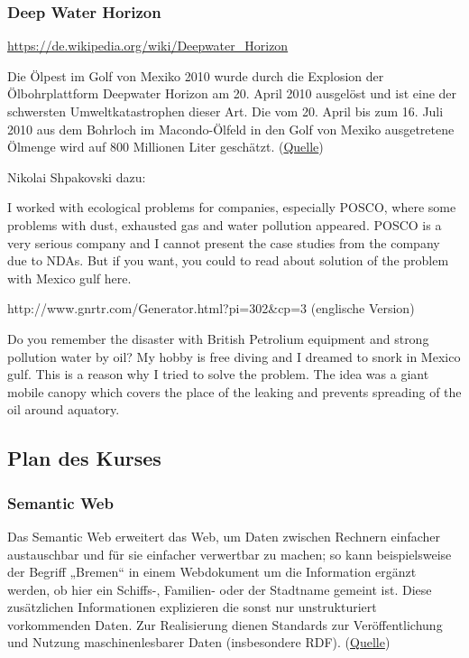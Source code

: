 \documentclass[11pt,a4paper]{article}
\begin{document}
\hypertarget{deep-water-horizon}{%
\subsubsection{Deep Water Horizon}\label{deep-water-horizon}}

\url{https://de.wikipedia.org/wiki/Deepwater_Horizon}

Die Ölpest im Golf von Mexiko 2010 wurde durch die Explosion der
Ölbohrplattform Deepwater Horizon am 20. April 2010 ausgelöst und ist
eine der schwersten Umweltkatastrophen dieser Art. Die vom 20. April bis
zum 16. Juli 2010 aus dem Bohrloch im Macondo-Ölfeld in den Golf von
Mexiko ausgetretene Ölmenge wird auf 800 Millionen Liter geschätzt.
(\href{https://de.wikipedia.org/wiki/\%C3\%96lpest_im_Golf_von_Mexiko_2010}{Quelle})

Nikolai Shpakovski dazu:

I worked with ecological problems for companies, especially POSCO, where
some problems with dust, exhausted gas and water pollution appeared.
POSCO is a very serious company and I cannot present the case studies
from the company due to NDAs. But if you want, you could to read about
solution of the problem with Mexico gulf here.

http://www.gnrtr.com/Generator.html?pi=302\&cp=3 (englische Version)

Do you remember the disaster with British Petrolium equipment and strong
pollution water by oil? My hobby is free diving and I dreamed to snork
in Mexico gulf. This is a reason why I tried to solve the problem. The
idea was a giant mobile canopy which covers the place of the leaking and
prevents spreading of the oil around aquatory.

\hypertarget{plan-des-kurses}{%
\subsection{Plan des Kurses}\label{plan-des-kurses}}

\hypertarget{semantic-web}{%
\subsubsection{Semantic Web}\label{semantic-web}}

Das Semantic Web erweitert das Web, um Daten zwischen Rechnern einfacher
austauschbar und für sie einfacher verwertbar zu machen; so kann
beispielsweise der Begriff „Bremen`` in einem Webdokument um die
Information ergänzt werden, ob hier ein Schiffs-, Familien- oder der
Stadtname gemeint ist. Diese zusätzlichen Informationen explizieren die
sonst nur unstrukturiert vorkommenden Daten. Zur Realisierung dienen
Standards zur Veröffentlichung und Nutzung maschinenlesbarer Daten
(insbesondere RDF).
(\href{https://de.wikipedia.org/wiki/Semantic_Web}{Quelle})
\end{document}
